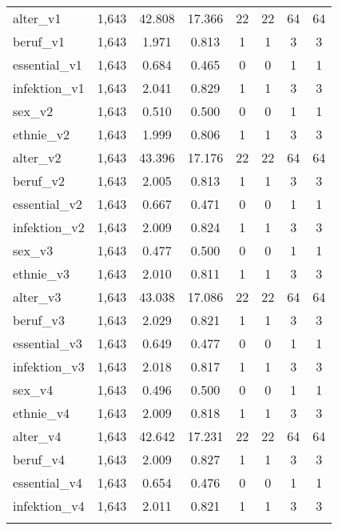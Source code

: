 \begin{table}[!htbp]
\begin{tabular}{@{\extracolsep{5pt}}lccccccc}
alter\_v1 & 1,643 & 42.808 & 17.366 & 22 & 22 & 64 & 64 \\ 
beruf\_v1 & 1,643 & 1.971 & 0.813 & 1 & 1 & 3 & 3 \\ 
essential\_v1 & 1,643 & 0.684 & 0.465 & 0 & 0 & 1 & 1 \\ 
infektion\_v1 & 1,643 & 2.041 & 0.829 & 1 & 1 & 3 & 3 \\ 
sex\_v2 & 1,643 & 0.510 & 0.500 & 0 & 0 & 1 & 1 \\ 
ethnie\_v2 & 1,643 & 1.999 & 0.806 & 1 & 1 & 3 & 3 \\ 
alter\_v2 & 1,643 & 43.396 & 17.176 & 22 & 22 & 64 & 64 \\ 
beruf\_v2 & 1,643 & 2.005 & 0.813 & 1 & 1 & 3 & 3 \\ 
essential\_v2 & 1,643 & 0.667 & 0.471 & 0 & 0 & 1 & 1 \\ 
infektion\_v2 & 1,643 & 2.009 & 0.824 & 1 & 1 & 3 & 3 \\ 
sex\_v3 & 1,643 & 0.477 & 0.500 & 0 & 0 & 1 & 1 \\ 
ethnie\_v3 & 1,643 & 2.010 & 0.811 & 1 & 1 & 3 & 3 \\ 
alter\_v3 & 1,643 & 43.038 & 17.086 & 22 & 22 & 64 & 64 \\ 
beruf\_v3 & 1,643 & 2.029 & 0.821 & 1 & 1 & 3 & 3 \\ 
essential\_v3 & 1,643 & 0.649 & 0.477 & 0 & 0 & 1 & 1 \\ 
infektion\_v3 & 1,643 & 2.018 & 0.817 & 1 & 1 & 3 & 3 \\ 
sex\_v4 & 1,643 & 0.496 & 0.500 & 0 & 0 & 1 & 1 \\ 
ethnie\_v4 & 1,643 & 2.009 & 0.818 & 1 & 1 & 3 & 3 \\ 
alter\_v4 & 1,643 & 42.642 & 17.231 & 22 & 22 & 64 & 64 \\ 
beruf\_v4 & 1,643 & 2.009 & 0.827 & 1 & 1 & 3 & 3 \\ 
essential\_v4 & 1,643 & 0.654 & 0.476 & 0 & 0 & 1 & 1 \\ 
infektion\_v4 & 1,643 & 2.011 & 0.821 & 1 & 1 & 3 & 3 \\ 
\hline \\[-1.8ex] 
\end{tabular} 
\end{table} 
